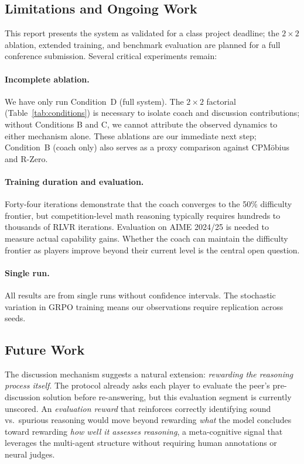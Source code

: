 \documentclass{article}
\begin{document}
\subsection{Limitations and Ongoing Work}

This report presents the system as validated for a class project deadline; the $2 \times 2$ ablation, extended training, and benchmark evaluation are planned for a full conference submission. Several critical experiments remain:

\paragraph{Incomplete ablation.} We have only run Condition~D (full system). The $2 \times 2$ factorial (Table~\ref{tab:conditions}) is necessary to isolate coach and discussion contributions; without Conditions B and C, we cannot attribute the observed dynamics to either mechanism alone. These ablations are our immediate next step; Condition~B (coach only) also serves as a proxy comparison against CPM\"{o}bius and R-Zero.

\paragraph{Training duration and evaluation.} Forty-four iterations demonstrate that the coach converges to the 50\% difficulty frontier, but competition-level math reasoning typically requires hundreds to thousands of RLVR iterations. Evaluation on AIME 2024/25 is needed to measure actual capability gains. Whether the coach can maintain the difficulty frontier as players improve beyond their current level is the central open question.

\paragraph{Single run.} All results are from single runs without confidence intervals. The stochastic variation in GRPO training means our observations require replication across seeds.

\subsection{Future Work}

The discussion mechanism suggests a natural extension: \emph{rewarding the reasoning process itself}. The protocol already asks each player to evaluate the peer's pre-discussion solution before re-answering, but this evaluation segment is currently unscored. An \emph{evaluation reward} that reinforces correctly identifying sound vs.\ spurious reasoning would move beyond rewarding \emph{what} the model concludes toward rewarding \emph{how well it assesses reasoning}, a meta-cognitive signal that leverages the multi-agent structure without requiring human annotations or neural judges.
\end{document}
